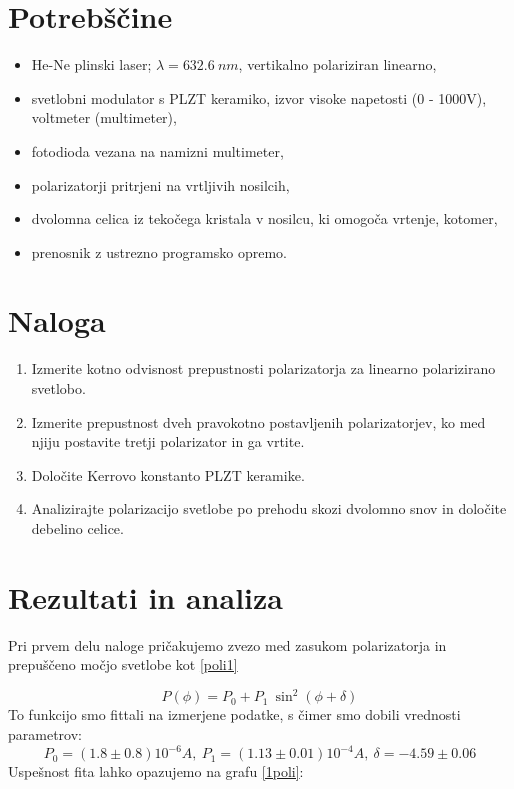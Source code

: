 \documentclass[12pt]{article}
\begin{document}
\section{Potrebščine}

\begin{itemize}
    \item He-Ne plinski laser; $\lambda = 632.6\ nm$, vertikalno polariziran linearno,
    \item svetlobni modulator s PLZT keramiko, izvor visoke napetosti (0 - 1000V), voltmeter (multimeter),
    \item fotodioda vezana na namizni multimeter,
    \item polarizatorji pritrjeni na vrtljivih nosilcih,
    \item dvolomna celica iz tekočega kristala v nosilcu, ki omogoča vrtenje, kotomer,
    \item prenosnik z ustrezno programsko opremo.
\end{itemize}

\section{Naloga}
\begin{enumerate}
    \item Izmerite kotno odvisnost prepustnosti polarizatorja za linearno polarizirano svetlobo.
    \item Izmerite prepustnost dveh pravokotno postavljenih polarizatorjev, ko med njiju postavite tretji polarizator in ga vrtite.
    \item Določite Kerrovo konstanto PLZT keramike.
    \item Analizirajte polarizacijo svetlobe po prehodu skozi dvolomno snov in določite debelino celice.
\end{enumerate}


\section{Rezultati in analiza}


Pri prvem delu naloge pričakujemo zvezo med zasukom polarizatorja in prepuščeno močjo svetlobe kot \ref{poli1}

\begin{equation}
    P(\phi) = P_0 + P_1\ \sin^2 \left(\phi + \delta\right)
    \label{poli1}
\end{equation}
To funkcijo smo fittali na izmerjene podatke, s čimer smo dobili vrednosti parametrov:
\begin{equation*}
    P_0 = (1.8 \pm 0.8) 10^{-6} A,\ P_1 = (1.13 \pm 0.01) 10^{-4} A,\ \delta = -4.59 \pm 0.06
\end{equation*}
Uspešnost fita lahko opazujemo na grafu \ref{1poli}:
\end{document}
